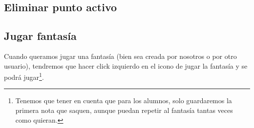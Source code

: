 \subsection{Eliminar punto activo}

\subsection{Jugar fantasía}
Cuando queramos jugar una fantasía (bien sea creada por nosotros o por otro usuario), tendremos que hacer click izquierdo en el icono de jugar la fantasía y se podrá jugar\footnote{Tenemos que tener en cuenta que para los alumnos, solo guardaremos la primera nota que saquen, aunque puedan repetir al fantasía tantas veces como quieran.}.
